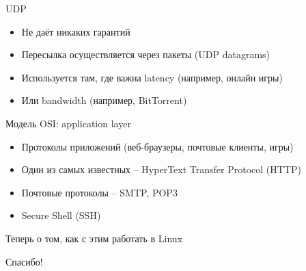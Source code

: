 \documentclass[10pt,pdf,hyperref={unicode}]{beamer}
\begin{document}
\begin{frame}{UDP}
\begin{itemize}
    \item Не даёт никаких гарантий
    \item Пересылка осуществляется через пакеты (UDP datagrams)
    \item Используется там, где важна latency (например, онлайн игры)
    \item Или bandwidth (например, BitTorrent)
\end{itemize}
\end{frame}

\begin{frame}{Модель OSI: application layer}
\begin{itemize}
    \item Протоколы приложений (веб-браузеры, почтовые клиенты, игры)
    \item Один из самых известных -- HyperText Transfer Protocol (HTTP)
    \item Почтовые протоколы -- SMTP, POP3
    \item Secure Shell (SSH)
\end{itemize}
\end{frame}

\begin{frame}
\center\Huge{Теперь о том, как с этим работать в Linux}
\end{frame}

\begin{frame}
\center\Huge{Спасибо!}
\end{frame}
\end{document}
